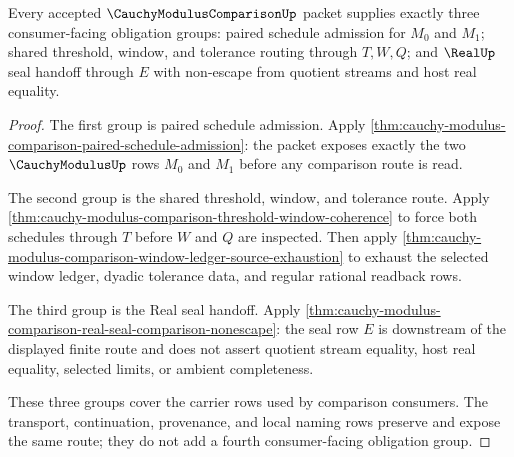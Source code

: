 \begin{theorem}
\label{thm:cauchy-modulus-comparison-obligation-triad}
Every accepted $\CauchyModulusComparisonUp$ packet supplies exactly three consumer-facing obligation groups: paired schedule admission for $M_0$ and $M_1$; shared threshold, window, and tolerance routing through $T,W,Q$; and $\RealUp$ seal handoff through $E$ with non-escape from quotient streams and host real equality.
\end{theorem}
\begin{proof}
The first group is paired schedule admission. Apply \autoref{thm:cauchy-modulus-comparison-paired-schedule-admission}: the packet exposes exactly the two $\CauchyModulusUp$ rows $M_0$ and $M_1$ before any comparison route is read.

The second group is the shared threshold, window, and tolerance route. Apply \autoref{thm:cauchy-modulus-comparison-threshold-window-coherence} to force both schedules through $T$ before $W$ and $Q$ are inspected. Then apply \autoref{thm:cauchy-modulus-comparison-window-ledger-source-exhaustion} to exhaust the selected window ledger, dyadic tolerance data, and regular rational readback rows.

The third group is the Real seal handoff. Apply \autoref{thm:cauchy-modulus-comparison-real-seal-comparison-nonescape}: the seal row $E$ is downstream of the displayed finite route and does not assert quotient stream equality, host real equality, selected limits, or ambient completeness.

These three groups cover the carrier rows used by comparison consumers. The transport, continuation, provenance, and local naming rows preserve and expose the same route; they do not add a fourth consumer-facing obligation group.
\end{proof}

